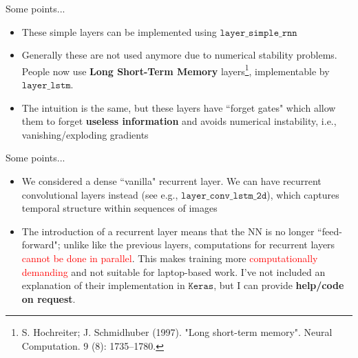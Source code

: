 \documentclass{beamer}
\begin{document}
\begin{frame}{Some points...}
\begin{itemize}
\item These simple layers can be implemented using $\texttt{layer\_simple\_rnn}$
\item Generally these are not used anymore due to numerical stability problems. People now use \textbf{Long Short-Term Memory} layers\footnote{S. Hochreiter; J. Schmidhuber (1997). "Long short-term memory". Neural Computation. 9 (8): 1735–1780.}, implementable by $\texttt{layer\_lstm}$.
\item The intuition is the same, but these layers have ``forget gates" which allow them to forget \textbf{useless information} and avoids numerical instability, i.e., vanishing/exploding gradients
\end{itemize}

\end{frame}
\begin{frame}{Some points...}
\begin{itemize}
\item We considered a dense ``vanilla" recurrent layer. We can have recurrent convolutional layers instead (see e.g., $\texttt{layer\_conv\_lstm\_2d}$), which captures temporal structure within sequences of images
\item The introduction of a recurrent layer means that the NN is no longer ``feed-forward"; unlike like the previous layers, computations for recurrent layers \textcolor{red}{cannot be done in parallel}. This makes training more \textcolor{red}{computationally demanding} and not suitable for laptop-based work. I've not included an explanation of their implementation in $\texttt{Keras}$, but I can provide \textbf{help/code on request}.
\end{itemize}
\end{frame}
\end{document}
